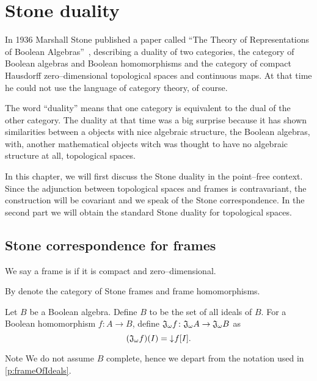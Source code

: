 \chapter{Stone duality}

In 1936 Marshall Stone published a paper called ``The Theory of Representations of Boolean Algebras''~\cite{stone1936theory}, describing a duality of two categories, the category of Boolean algebras and Boolean homomorphisms and the category of compact Hausdorff zero--dimensional topological spaces and continuous maps. At that time he could not use the language of category theory, of course.

The word ``duality'' means that one category is equivalent to the dual of the other category.
The duality at that time was a big surprise because it has shown similarities between a objects with nice algebraic structure, the Boolean algebras, with, another mathematical objects witch was thought to have no algebraic structure at all, topological spaces.

In this chapter, we will first discuss the Stone duality in the point--free context. Since the adjunction between topological spaces and frames is contravariant, the construction will be covariant and we speak of the Stone correspondence. In the second part we will obtain the standard Stone duality for topological spaces.

\section{Stone correspondence for frames}

\begin{definition}
    We say a frame is  if it is compact and zero--dimensional.

    By \DEF{\StoneFrm{}} denote the category of Stone frames and frame homomorphisms.
\end{definition}

\begin{definition}
    Let $B$ be a Boolean algebra. Define $B$ to be the set of all ideals of $B$.
    For a Boolean homomorphism $f\colon A \to B$, define $\mathfrak{J}_{\omega} f\colon \mathfrak{J}_{\omega} A \to \mathfrak{J}_{\omega} B$ as
    $$(\mathfrak{J}_{\omega} f)(I) = \mathord{\downarrow}\mkern1mu f[I].$$
\end{definition}

\begin{block*}{Note}
    We do not assume $B$ complete, hence we depart from the notation used in \ref{p:frameOfIdeals}.
\end{block*}

